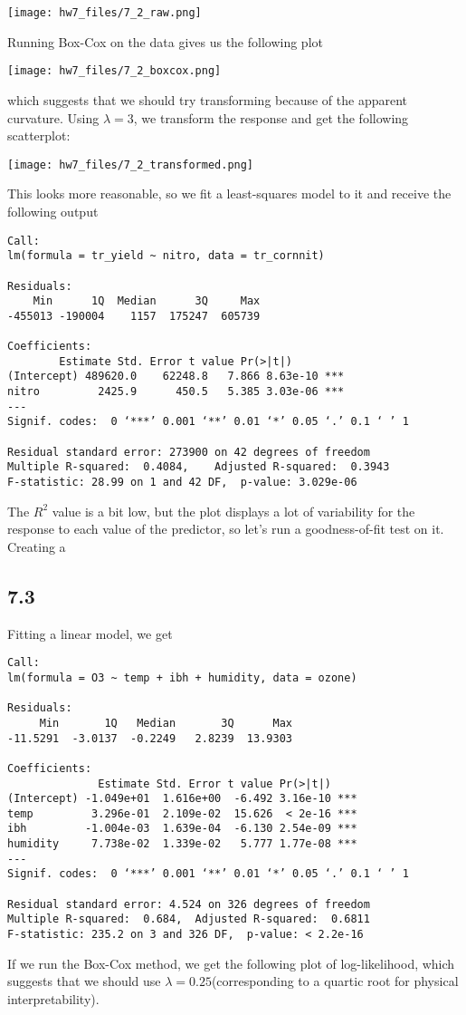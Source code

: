 \documentclass{article}
\begin{document}
\texttt{[image: hw7\_files/7\_2\_raw.png]}

Running Box-Cox on the data gives us the following plot 

\texttt{[image: hw7\_files/7\_2\_boxcox.png]}

which suggests that we should try transforming because of the apparent curvature. Using $\lambda=3$, we transform the response and get the following scatterplot:

\texttt{[image: hw7\_files/7\_2\_transformed.png]}

This looks more reasonable, so we fit a least-squares model to it and receive the following output

\begin{verbatim}
Call:
lm(formula = tr_yield ~ nitro, data = tr_cornnit)

Residuals:
    Min      1Q  Median      3Q     Max 
-455013 -190004    1157  175247  605739 

Coefficients:
        Estimate Std. Error t value Pr(>|t|)    
(Intercept) 489620.0    62248.8   7.866 8.63e-10 ***
nitro         2425.9      450.5   5.385 3.03e-06 ***
---
Signif. codes:  0 ‘***’ 0.001 ‘**’ 0.01 ‘*’ 0.05 ‘.’ 0.1 ‘ ’ 1

Residual standard error: 273900 on 42 degrees of freedom
Multiple R-squared:  0.4084,    Adjusted R-squared:  0.3943 
F-statistic: 28.99 on 1 and 42 DF,  p-value: 3.029e-06
\end{verbatim}

The $R^2$ value is a bit low, but the plot displays a lot of variability for the response to each value of the predictor, so let's run a goodness-of-fit test on it. Creating a 

\subsection*{7.3}
Fitting a linear model, we get 
\begin{verbatim}
Call:
lm(formula = O3 ~ temp + ibh + humidity, data = ozone)

Residuals:
     Min       1Q   Median       3Q      Max 
-11.5291  -3.0137  -0.2249   2.8239  13.9303 

Coefficients:
              Estimate Std. Error t value Pr(>|t|)    
(Intercept) -1.049e+01  1.616e+00  -6.492 3.16e-10 ***
temp         3.296e-01  2.109e-02  15.626  < 2e-16 ***
ibh         -1.004e-03  1.639e-04  -6.130 2.54e-09 ***
humidity     7.738e-02  1.339e-02   5.777 1.77e-08 ***
---
Signif. codes:  0 ‘***’ 0.001 ‘**’ 0.01 ‘*’ 0.05 ‘.’ 0.1 ‘ ’ 1

Residual standard error: 4.524 on 326 degrees of freedom
Multiple R-squared:  0.684,  Adjusted R-squared:  0.6811 
F-statistic: 235.2 on 3 and 326 DF,  p-value: < 2.2e-16
\end{verbatim}
If we run the Box-Cox method, we get the following plot of log-likelihood, which suggests that we should use $\lambda=0.25$(corresponding to a quartic root for physical interpretability). 
\end{document}
